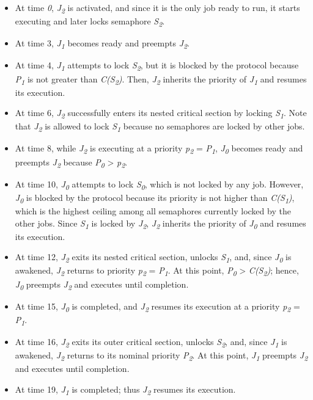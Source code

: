 \begin{itemize}
\item
  At time \emph{0}, \emph{J\textsubscript{2}} is activated, and since it
  is the only job ready to run, it starts executing and later locks
  semaphore \emph{S\textsubscript{2}}.
\item
  At time 3, \emph{J\textsubscript{1}} becomes ready and preempts
  \emph{J\textsubscript{2}}.
\item
  At time 4, \emph{J\textsubscript{1}} attempts to lock
  \emph{S\textsubscript{2}}, but it is blocked by the protocol because
  \emph{P\textsubscript{1}} is not greater than
  \emph{C(S\textsubscript{2})}. Then, \emph{J\textsubscript{2}} inherits
  the priority of \emph{J\textsubscript{1}} and resumes its execution.
\item
  At time 6, \emph{J\textsubscript{2}} successfully enters its nested
  critical section by locking \emph{S\textsubscript{1}}. Note that
  \emph{J\textsubscript{2}} is allowed to lock \emph{S\textsubscript{1}}
  because no semaphores are locked by other jobs.
\item
  At time 8, while \emph{J\textsubscript{2}} is executing at a priority
  \emph{p\textsubscript{2}} = \emph{P\textsubscript{1}},
  \emph{J\textsubscript{0}} becomes ready and preempts
  \emph{J\textsubscript{2}} because \emph{P\textsubscript{0}}
  \textgreater{} \emph{p\textsubscript{2}}.
\item
  At time 10, \emph{J\textsubscript{0}} attempts to lock
  \emph{S\textsubscript{0}}, which is not locked by any job. However,
  \emph{J\textsubscript{0}} is blocked by the protocol because its
  priority is not higher than \emph{C(S\textsubscript{1})}, which is the
  highest ceiling among all semaphores currently locked by the other
  jobs. Since \emph{S\textsubscript{1}} is locked by
  \emph{J\textsubscript{2}}, \emph{J\textsubscript{2}} inherits the
  priority of \emph{J\textsubscript{0}} and resumes its execution.
\item
  At time 12, \emph{J\textsubscript{2}} exits its nested critical
  section, unlocks \emph{S\textsubscript{1}}, and, since
  \emph{J\textsubscript{0}} is awakened, \emph{J\textsubscript{2}}
  returns to priority \emph{p\textsubscript{2}} =
  \emph{P\textsubscript{1}}. At this point, \emph{P\textsubscript{0}}
  \textgreater{} \emph{C(S\textsubscript{2})}; hence,
  \emph{J\textsubscript{0}} preempts \emph{J\textsubscript{2}} and
  executes until completion.
\item
  At time 15, \emph{J\textsubscript{0}} is completed, and
  \emph{J\textsubscript{2}} resumes its execution at a priority
  \emph{p\textsubscript{2}} = \emph{P\textsubscript{1}}.
\item
  At time 16, \emph{J\textsubscript{2}} exits its outer critical
  section, unlocks \emph{S\textsubscript{2}}, and, since
  \emph{J\textsubscript{1}} is awakened, \emph{J\textsubscript{2}}
  returns to its nominal priority \emph{P\textsubscript{2}}. At this
  point, \emph{J\textsubscript{1}} preempts \emph{J\textsubscript{2}}
  and executes until completion.
\item
  At time 19, \emph{J\textsubscript{1}} is completed; thus
  \emph{J\textsubscript{2 }}resumes its execution.
\end{itemize}

